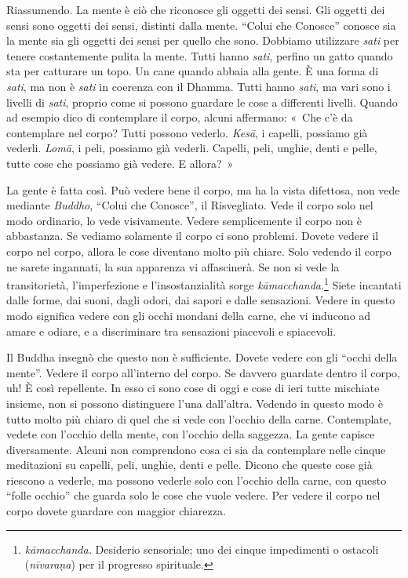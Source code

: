 Riassumendo. La mente è ciò che riconosce gli oggetti dei sensi. Gli
oggetti dei sensi sono oggetti dei sensi, distinti dalla mente. ``Colui
che Conosce'' conosce sia la mente sia gli oggetti dei sensi per quello
che sono. Dobbiamo utilizzare \emph{sati} per tenere costantemente
pulita la mente. Tutti hanno \emph{sati}, perfino un gatto quando sta
per catturare un topo. Un cane quando abbaia alla gente. È una forma di
\emph{sati}, ma non è \emph{sati} in coerenza con il Dhamma. Tutti hanno
\emph{sati}, ma vari sono i livelli di \emph{sati}, proprio come si
possono guardare le cose a differenti livelli. Quando ad esempio dico di
contemplare il corpo, alcuni affermano: «~Che c'è da contemplare nel
corpo? Tutti possono vederlo. \emph{Kesā}, i capelli, possiamo già
vederli. \emph{Lomā}, i peli, possiamo già vederli. Capelli, peli,
unghie, denti e pelle, tutte cose che possiamo già vedere. E allora?~»

La gente è fatta così. Può vedere bene il corpo, ma ha la vista
difettosa, non vede mediante \emph{Buddho}, ``Colui che Conosce'', il
Risvegliato. Vede il corpo solo nel modo ordinario, lo vede visivamente.
Vedere semplicemente il corpo non è abbastanza. Se vediamo solamente il
corpo ci sono problemi. Dovete vedere il corpo nel corpo, allora le cose
diventano molto più chiare. Solo vedendo il corpo ne sarete ingannati,
la sua apparenza vi affascinerà. Se non si vede la transitorietà,
l'imperfezione e l'insostanzialità sorge \emph{kāmacchanda}.\footnote{%
  \emph{kāmacchanda.}
  Desiderio sensoriale; uno dei cinque impedimenti o ostacoli
  (\emph{nīvaraṇa}) per il progresso spirituale.} Siete incantati dalle
forme, dai suoni, dagli odori, dai sapori e dalle sensazioni. Vedere in
questo modo significa vedere con gli occhi mondani della carne, che vi
inducono ad amare e odiare, e a discriminare tra sensazioni piacevoli e
spiacevoli.

Il Buddha insegnò che questo non è sufficiente. Dovete vedere con gli
``occhi della mente''. Vedere il corpo all'interno del corpo. Se davvero
guardate dentro il corpo, uh! È così repellente. In esso ci sono cose di
oggi e cose di ieri tutte mischiate insieme, non si possono distinguere
l'una dall'altra. Vedendo in questo modo è tutto molto più chiaro di
quel che si vede con l'occhio della carne. Contemplate, vedete con
l'occhio della mente, con l'occhio della saggezza. La gente capisce
diversamente. Alcuni non comprendono cosa ci sia da contemplare nelle
cinque meditazioni su capelli, peli, unghie, denti e pelle. Dicono che
queste cose già riescono a vederle, ma possono vederle solo con l'occhio
della carne, con questo ``folle occhio'' che guarda solo le cose che
vuole vedere. Per vedere il corpo nel corpo dovete guardare con maggior
chiarezza.

